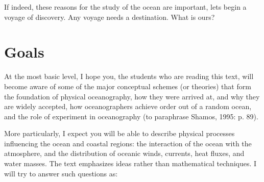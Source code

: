 If indeed, these reasons for the study of the ocean are important,
lets begin a voyage of discovery. Any voyage needs a destination. What
is ours?

\section{Goals}
At the most basic level, I hope you, the students who are reading this
text, will become aware of some of the major conceptual schemes (or
theories) that form the foundation of physical
oceanography, how they were
arrived at, and why they are widely accepted, how oceanographers
achieve order out of a random ocean, and the role of experiment in
oceanography (to paraphrase Shamos, 1995: p. 89).

More particularly, I expect you will be able to describe physical
processes influencing the ocean and coastal regions: the interaction
of the ocean with the atmosphere, and the distribution of oceanic
winds, currents, heat fluxes, and water masses. The
text emphasizes ideas rather than mathematical techniques. I will try
to answer such questions as:
